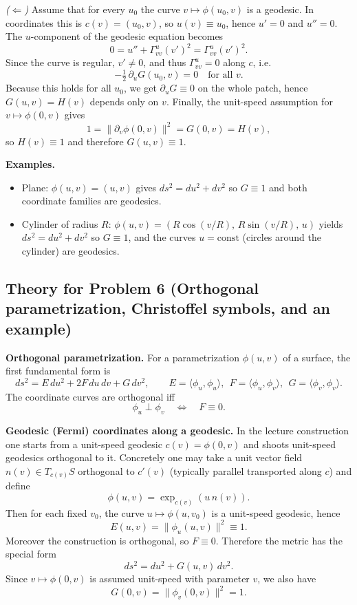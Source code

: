 \documentclass[12pt,a4paper]{article}
\theoremstyle{plain}
\theoremstyle{definition}      %
\begin{document}
\smallskip
\emph{($\Leftarrow$)} Assume that for every $u_0$ the curve $v\mapsto \phi(u_0,v)$ is a geodesic.
In coordinates this is $c(v)=(u_0,v)$, so $u(v)\equiv u_0$, hence $u'=0$ and $u''=0$.
The $u$-component of the geodesic equation becomes
\[
0=u''+\Gamma^{u}_{vv}(v')^2=\Gamma^{u}_{vv}(v')^2.
\]
Since the curve is regular, $v'\neq 0$, and thus $\Gamma^{u}_{vv}=0$ along $c$, i.e.
\[
-\tfrac12\,\partial_u G(u_0,v)=0\quad \text{for all }v.
\]
Because this holds for all $u_0$, we get $\partial_u G\equiv 0$ on the whole patch, hence $G(u,v)=H(v)$ depends only on $v$.
Finally, the unit-speed assumption for $v\mapsto\phi(0,v)$ gives
\[
1=\|\partial_v\phi(0,v)\|^2 = G(0,v)=H(v),
\]
so $H(v)\equiv 1$ and therefore $G(u,v)\equiv 1$.

\medskip
\textbf{Examples.}
\begin{itemize}
	\item Plane: $\phi(u,v)=(u,v)$ gives $ds^2=du^2+dv^2$ so $G\equiv 1$ and both coordinate families are geodesics.
	\item Cylinder of radius $R$: $\phi(u,v)=(R\cos(v/R),\,R\sin(v/R),\,u)$ yields $ds^2=du^2+dv^2$ so $G\equiv 1$,
	and the curves $u=\mathrm{const}$ (circles around the cylinder) are geodesics.
\end{itemize}

\subsection*{Theory for Problem 6 (Orthogonal parametrization, Christoffel symbols, and an example)}

\textbf{Orthogonal parametrization.}
For a parametrization $\phi(u,v)$ of a surface, the first fundamental form is
\[
ds^2 = E\,du^2 + 2F\,du\,dv + G\,dv^2,
\qquad
E=\langle\phi_u,\phi_u\rangle,\ \ F=\langle\phi_u,\phi_v\rangle,\ \ G=\langle\phi_v,\phi_v\rangle.
\]
The coordinate curves are orthogonal iff
\[
\phi_u \perp \phi_v \quad\Longleftrightarrow\quad F\equiv 0.
\]

\medskip
\textbf{Geodesic (Fermi) coordinates along a geodesic.}
In the lecture construction one starts from a unit-speed geodesic $c(v)=\phi(0,v)$ and shoots unit-speed
geodesics orthogonal to it. Concretely one may take a unit vector field $n(v)\in T_{c(v)}S$ orthogonal to $c'(v)$
(typically parallel transported along $c$) and define
\[
\phi(u,v)=\exp_{c(v)}(u\,n(v)).
\]
Then for each fixed $v_0$, the curve $u\mapsto \phi(u,v_0)$ is a unit-speed geodesic, hence
\[
E(u,v)=\|\phi_u(u,v)\|^2 \equiv 1.
\]
Moreover the construction is orthogonal, so $F\equiv 0$. Therefore the metric has the special form
\[
ds^2 = du^2 + G(u,v)\,dv^2.
\]
Since $v\mapsto \phi(0,v)$ is assumed unit-speed with parameter $v$, we also have
\[
G(0,v)=\|\phi_v(0,v)\|^2 = 1.
\]
\end{document}
